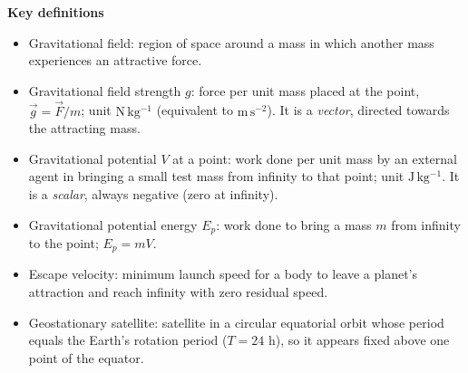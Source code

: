 \documentclass[11pt]{article}
\newcommand{\cle}[1]{{\popxbold\color{popdark}#1}}
\begin{document}
\begin{bilan}
\textbf{Key definitions}
\begin{itemize}
\item \cle{Gravitational field}: region of space around a mass in which another mass experiences an attractive force.
\item \cle{Gravitational field strength} $g$: force per unit mass placed at the point, $\vec{g}=\vec{F}/m$; unit $\mathrm{N\,kg^{-1}}$ (equivalent to $\mathrm{m\,s^{-2}}$). It is a \emph{vector}, directed towards the attracting mass.
\item \cle{Gravitational potential} $V$ at a point: work done per unit mass by an external agent in bringing a small test mass from infinity to that point; unit $\mathrm{J\,kg^{-1}}$. It is a \emph{scalar}, always negative (zero at infinity).
\item \cle{Gravitational potential energy} $E_p$: work done to bring a mass $m$ from infinity to the point; $E_p=mV$.
\item \cle{Escape velocity}: minimum launch speed for a body to leave a planet's attraction and reach infinity with zero residual speed.
\item \cle{Geostationary satellite}: satellite in a circular equatorial orbit whose period equals the Earth's rotation period ($T=24$ h), so it appears fixed above one point of the equator.
\end{itemize}


\end{bilan}
\end{document}
